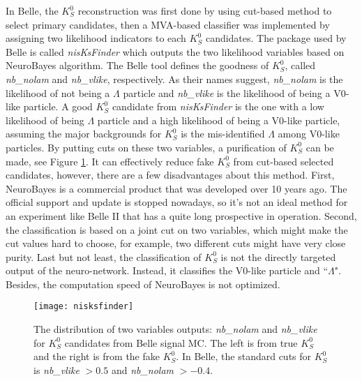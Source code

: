  In Belle, the $K_S^0$ reconstruction was first done by using cut-based method to select primary candidates, then a MVA-based classifier was implemented by assigning two likelihood indicators to each $K_S^0$ candidates. The package used by Belle is called \textit{nisKsFinder}\cite{b2book} which outputs the two likelihood variables based on NeuroBayes algorithm\cite{feindt2006neurobayes}. The Belle tool defines the goodness of $K_S^0$, called \textit{nb\_nolam} and \textit{nb\_vlike}, respectively. As their names suggest, \textit{nb\_nolam} is the likelihood of not being a $\Lambda$ particle and \textit{nb\_vlike} is the likelihood of being a V0-like particle. A good $K_S^0$ candidate from \textit{nisKsFinder} is the one with a low likelihood of being $\Lambda$ particle and a high likelihood of being a V0-like particle, assuming the major backgrounds for $K_S^0$ is the mis-identified $\Lambda$ among V0-like particles. By putting cuts on these two variables, a purification of $K_S^0$ can be made, see Figure \ref{b1niskf}. It can effectively reduce fake $K_S^0$ from cut-based selected candidates, however, there are a few disadvantages about this method. First, NeuroBayes is a commercial product that was developed over 10 years ago. The official support and update is stopped nowadays, so it's not an ideal method for an experiment like Belle II that has a quite long prospective in operation. Second, the classification is based on a joint cut on two variables, which might make the cut values hard to choose, for example, two different cuts might have very close purity. Last but not least, the classification of $K_S^0$ is not the directly targeted output of the neuro-network. Instead, it classifies the V0-like particle and ``$\Lambda$". Besides, the computation speed of NeuroBayes is not optimized.

\begin{figure}[htpb]
	\centering 
	\texttt{[image: nisksfinder]}
	\caption{The distribution of two variables outputs: \textit{nb\_nolam} and \textit{nb\_vlike} for $K_S^0$ candidates from Belle signal MC. The left is from true $K_S^0$ and the right is from the fake $K_S^0$. In Belle, the standard cuts for $K_S^0$ is \textit{nb\_vlike} $> 0.5$ and \textit{nb\_nolam} $> -0.4$\cite{kang2020measurement}.}
	\label{b1niskf}
\end{figure}


